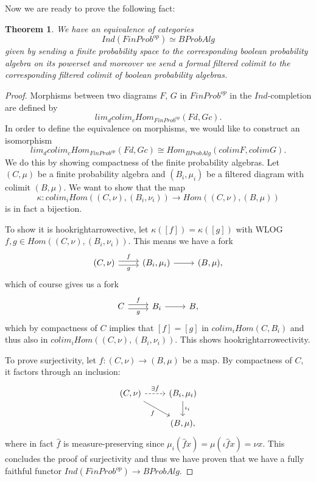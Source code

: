 \documentclass[a4paper,draft]{amsproc}
\theoremstyle{plain}
\newtheorem{theorem}{Theorem}[section]
\theoremstyle{definition}
\theoremstyle{remark}
\numberwithin{equation}{section}
\begin{document}
Now we are ready to prove the following fact:

\begin{theorem} We have an equivalence of categories
\[
Ind(FinProb^{op}) \simeq BProbAlg
\]
given by sending a finite probability space to the corresponding boolean probability algebra on its powerset and moreover we send a formal filtered colimit to the corresponding filtered colimit of boolean probability algebras.
\end{theorem}
\begin{proof}
Morphisms between two diagrams $F$, $G$ in $FinProb^{op}$ in the $Ind$-completion are defined by
\[
lim_d colim_c Hom_{FinProb^{op}}(F d, G c).
\]
In order to define the equivalence on morphisms, we would like to construct an isomorphism
\[
lim_d colim_c Hom_{FinProb^{op}}(F d, G c) \cong Hom_{BProbAlg}(colim F, colim G).
\]
We do this by showing compactness of the finite probability algebras. Let $(C, \mu)$ be a finite probability algebra and $(B_i, \mu_i)$ be a filtered diagram with colimit $(B, \mu)$. We want to show that the map
\[
\kappa: colim_i Hom((C, \nu), (B_i, \nu_i)) \to Hom((C,\nu), (B,\mu))
\]
is in fact a bijection.

To show it is hookrightarrowective, let $\kappa([f]) = \kappa([g])$ with WLOG $f,g \in Hom((C,\nu), (B_i, \nu_i))$. This means we have a fork
\[
\begin{tikzcd}
{(C,\nu)} \arrow[r, "f", shift left] \arrow[r, "g"', shift right] & {(B_i,\mu_i)} \arrow[r] & {(B,\mu)},
\end{tikzcd}
\]
which of course gives us a fork
\[
\begin{tikzcd}
C \arrow[r, "f", shift left] \arrow[r, "g"', shift right] & B_i \arrow[r] & B,
\end{tikzcd}
\]
which by compactness of $C$ implies that $[f] = [g]$ in $colim_i Hom(C,B_i)$ and thus also in $colim_i Hom((C,\nu), (B_i, \nu_i))$. This shows hookrightarrowectivity.

To prove surjectivity, let $f:(C, \nu) \to (B,\mu)$ be a map. By compactness of $C$, it factors through an inclusion:
\[
\begin{tikzcd}
{(C,\nu)} \arrow[r, "\exists \hat{f}", dashed] \arrow[rd, "f"'] & {(B_i,\mu_i)} \arrow[d, "\iota_i"] \\
                                                                & {(B,\mu)}                         ,
\end{tikzcd}
\]
where in fact $\hat{f}$ is measure-preserving since $\mu_i(\hat{f} x) = \mu(\iota \hat{f} x) = \nu x$. This concludes the proof of surjectivity and thus we have proven that we have a fully faithful functor $Ind(FinProb^{op}) \to BProbAlg$.


\end{proof}
\end{document}
